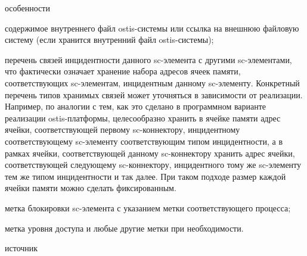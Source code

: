 \begin{scnsubstruct}
\begin{scnrelfromset}{особенности}
{\begin{scnitemize}
				\item{содержимое внутреннего файл ostis-системы или ссылка на внешнюю файловую систему (если хранится внутренний файл ostis-системы);}
				\item{перечень связей инцидентности данного sc-элемента с другими sc-элементами, что фактически означает хранение набора адресов ячеек памяти, соответствующих sc-элементам, инцидентным данному sc-элементу. Конкретный перечень типов хранимых связей может уточняться в зависимости от реализации. Например, по аналогии с тем, как это сделано в программном варианте реализации ostis-платформы, целесообразно хранить в ячейке памяти адрес ячейки, соответствующей первому sc-коннектору, инцидентному соответствующему sc-элементу соответствующим типом инцидентности, а в рамках ячейки, соответствующей данному sc-коннектору хранить адрес ячейки, соответствующей следующему sc-коннектору, инцидентного тому же sc-элементу тем же типом инцидентности и так далее. При таком подходе размер каждой ячейки памяти можно сделать фиксированным.}
				\item{метка блокировки sc-элемента с указанием метки соответствующего процесса;}
				\item{метка уровня доступа и любые другие метки при необходимости.}
		\end{scnitemize}}
		\begin{scnrelfromlist}{источник}
		\end{scnrelfromlist}

\end{scnrelfromset}
\end{scnsubstruct}
